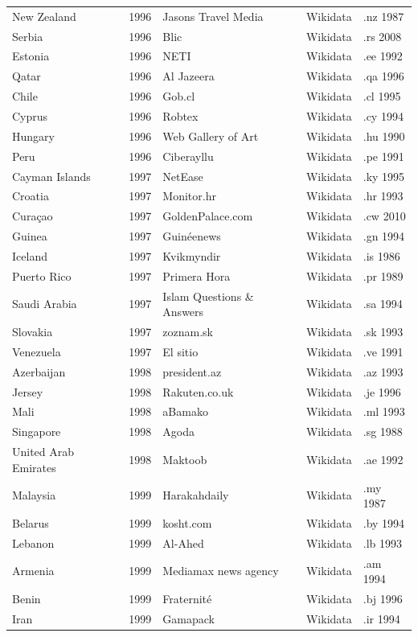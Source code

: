 \documentclass[11pt,a4paper]{article}
\begin{document}
\begin{small}
\begin{longtable}{lrp{6.2cm}ll}
New Zealand & 1996 & Jasons Travel Media & Wikidata & .nz 1987\\
Serbia & 1996 & Blic & Wikidata & .rs 2008\\
Estonia & 1996 & NETI & Wikidata & .ee 1992\\
Qatar & 1996 & Al Jazeera & Wikidata & .qa 1996\\
Chile & 1996 & Gob.cl & Wikidata & .cl 1995\\
Cyprus & 1996 & Robtex & Wikidata & .cy 1994\\
Hungary & 1996 & Web Gallery of Art & Wikidata & .hu 1990\\
Peru & 1996 & Ciberayllu & Wikidata & .pe 1991\\
Cayman Islands & 1997 & NetEase & Wikidata & .ky 1995\\
Croatia & 1997 & Monitor.hr & Wikidata & .hr 1993\\
Curaçao & 1997 & GoldenPalace.com & Wikidata & .cw 2010\\
Guinea & 1997 & Guinéenews & Wikidata & .gn 1994\\
Iceland & 1997 & Kvikmyndir & Wikidata & .is 1986\\
Puerto Rico & 1997 & Primera Hora & Wikidata & .pr 1989\\
Saudi Arabia & 1997 & Islam Questions \& Answers & Wikidata & .sa 1994\\
Slovakia & 1997 & zoznam.sk & Wikidata & .sk 1993\\
Venezuela & 1997 & El sitio & Wikidata & .ve 1991\\
Azerbaijan & 1998 & president.az & Wikidata & .az 1993\\
Jersey & 1998 & Rakuten.co.uk & Wikidata & .je 1996\\
Mali & 1998 & aBamako & Wikidata & .ml 1993\\
Singapore & 1998 & Agoda & Wikidata & .sg 1988\\
United Arab Emirates & 1998 & Maktoob & Wikidata & .ae 1992\\
Malaysia & 1999 & Harakahdaily & Wikidata & .my 1987\\
Belarus & 1999 & kosht.com & Wikidata & .by 1994\\
Lebanon & 1999 & Al-Ahed & Wikidata & .lb 1993\\
Armenia & 1999 & Mediamax news agency & Wikidata & .am 1994\\
Benin & 1999 & Fraternité & Wikidata & .bj 1996\\
Iran & 1999 & Gamapack & Wikidata & .ir 1994\\

\end{longtable}
\end{small}
\end{document}
